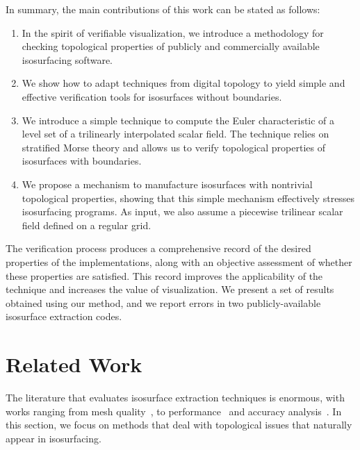In summary, the main contributions of this work can be stated as
follows:
\begin{enumerate}[topsep=0px,partopsep=0px,itemsep=0px,parsep=0px]
\item In the spirit of verifiable visualization, we introduce a
  methodology for checking topological properties of publicly and
  commercially available isosurfacing software.
\item We show how to adapt techniques from digital topology to yield simple
  and effective verification tools for isosurfaces without
  boundaries.
\item We introduce a simple technique to compute the Euler
  characteristic of a level set of a trilinearly interpolated scalar
  field. The technique relies on stratified Morse theory and allows
  us to verify topological properties of isosurfaces with boundaries.
\item We propose a mechanism to manufacture isosurfaces with
  nontrivial topological properties, showing that this simple
  mechanism effectively stresses isosurfacing programs. As input, we
  also assume a piecewise trilinear scalar field defined on a regular
  grid.
\end{enumerate}
The verification process produces a comprehensive record of the desired properties
of the implementations, along with an objective assessment of whether these
properties are satisfied. This record improves the
applicability of the technique and increases the value of
visualization.
%
%
%
We present a set of results obtained using our method, and we report
errors in two publicly-available isosurface extraction codes.

\section{Related Work}
\label{sec:rw}
 
The literature that evaluates isosurface extraction
techniques is enormous, with works ranging from mesh
quality~\cite{Dietrich:TVCG:2008,Schreiner06,Raman:2008:QIM}, to
performance~\cite{Sutton00acase} and accuracy
analysis~\cite{patera04,zhou01}.
%
In this section, we focus
on methods that deal with
topological issues that naturally appear in isosurfacing. 

